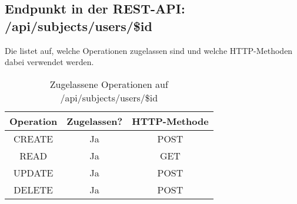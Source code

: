 \subsection{Endpunkt in der REST-API: /api/subjects/users/\$id}
Die  listet auf, welche Operationen zugelassen sind und welche HTTP-Methoden dabei verwendet werden. 

\begin{table}[!htbp]
	\begin{tabular}{|c|c|c|}
		\hline
			\textbf{Operation} & \textbf{Zugelassen?} & \textbf{HTTP-Methode} \\ \hline
			CREATE & Ja & POST \\ \hline 
			READ & Ja & GET \\ \hline
			UPDATE & Ja & POST \\ \hline 
			DELETE & Ja & POST \\ \hline
	\end{tabular}

		\caption{Zugelassene Operationen auf /api/subjects/users/\$id}
		\label{tab:end:rest:api:subjects:users:id:meth}
\end{table}